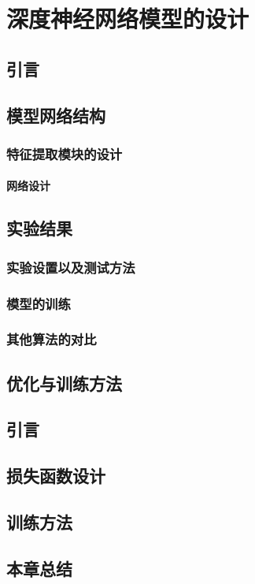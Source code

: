 \chapter{深度神经网络模型的设计}

\section{引言}

\section{模型网络结构}
\subsection{特征提取模块的设计}
\subsubsection{网络设计}

\section{实验结果}
\subsection{实验设置以及测试方法}
\subsection{模型的训练}
\subsection{其他算法的对比}

\section{优化与训练方法}
\section{引言}
\section{损失函数设计}
\section{训练方法}

\section{本章总结}